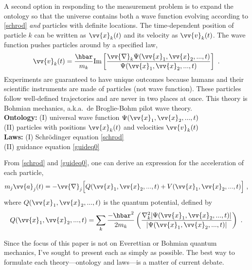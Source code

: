 \documentclass[12pt,secnumarabic,balancelastpage,amsmath,amssymb,nofootinbib]{article}
\begin{document}
A second option in responding to the measurement problem is to expand the ontology so that the universe contains both a wave function evolving according to \eqref{schrod} \emph{and} particles with definite locations.  The time-dependent position of particle $k$ can be written as $\vv{x}_k(t)$ and its velocity as $\vv{v}_k(t)$.  The wave function pushes particles around by a specified law,
\begin{equation}
\vv{v}_k(t)=\frac{\hbar}{m_k}\mbox{Im}\left[\frac{\vv{\nabla}_k\Psi(\vv{x}_1,\vv{x}_2,...,t)}{\Psi(\vv{x}_1,\vv{x}_2,...,t)}\right]\ .
\label{guideq0}
\end{equation}
Experiments are guaranteed to have unique outcomes because humans and their scientific instruments are made of particles (not wave function).  These particles follow well-defined trajectories and are never in two places at once.  This theory is Bohmian mechanics, a.k.a.\ de Broglie-Bohm pilot wave theory.
\vspace*{6 pt}\\\hspace*{1.2cm}\textbf{Ontology:} (I) universal wave function $\Psi(\vv{x}_1,\vv{x}_2,...,t)$
\\\hspace*{1.2cm}(II) particles with positions $\vv{x}_k(t)$ and velocities $\vv{v}_k(t)$
\\\hspace*{1.2cm}\textbf{Laws:} (I) Schr\"{o}dinger equation \eqref{schrod}
\\\hspace*{1.2cm}(II) guidance equation \eqref{guideq0}\vspace*{6 pt}

From \eqref{schrod} and \eqref{guideq0}, one can derive an expression for the acceleration of each particle,
\begin{equation}
m_j \vv{a}_j(t)=-\vv{\nabla}_j\Big[Q(\vv{x}_1,\vv{x}_2,...,t)+V(\vv{x}_1,\vv{x}_2,...,t)\Big]\ ,
\label{oldeom}
\end{equation}
where $Q(\vv{x}_1,\vv{x}_2,...,t)$ is the quantum potential, defined by
\begin{equation}
Q(\vv{x}_1,\vv{x}_2,...,t)=\sum_k \frac{-\hbar^2}{2 m_k }\left(\frac{\nabla_k^2 |\Psi(\vv{x}_1,\vv{x}_2,...,t)|}{|\Psi(\vv{x}_1,\vv{x}_2,...,t)|}\right)\ .
\label{defofQ}
\end{equation}

Since the focus of this paper is not on Everettian or Bohmian quantum mechanics, I've sought to present each as simply as possible.  The best way to formulate each theory---ontology and laws---is a matter of current debate.
\end{document}
